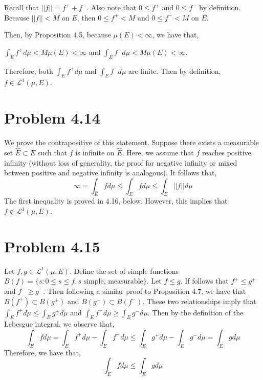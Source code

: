 \documentclass[letterpaper,12pt]{article}
\theoremstyle{definition}
\begin{document}
    Recall that $||f|| = f^+ +  f^-$.  Also note that $0 \leq f^+$ and $0 \leq f^-$ by definition. Because $||f|| < M$ on $E$, then $0 \leq f^+ < M$ and $0 \leq f^- < M$ on $E$.
\newline

 Then, by Proposition 4.5, because $\mu(E) < \infty$, we have that,


      $\int_E f^+ d\mu < M \mu(E) < \infty$ and $
      \int_E f^- d\mu < M \mu(E) < \infty$.
\newline

 Therefore, both $\int_E f^+ d\mu$ and $\int_E f^- d\mu$ are finite. Then by definition, $f \in \mathscr{L}^1(\mu, E)$.

 \section*{Problem 4.14}
  We prove the contrapositive of this statement. Suppose there exists a measurable set $\hat{E} \subset E$ such that $f$ is infinite on $\hat{E}$. Here, we assume that $f$ reaches positive infinity (without loss of generality, the proof for negative infinity or mixed between positive and negative infinity is analogous). It follows that,
  \begin{equation*}
  	\infty = \int_{\hat{E}} f d\mu \leq \int_E f d\mu \leq \int_E ||f|| d\mu
  \end{equation*}
  The first inequality is proved in 4.16, below. However, this implies that $f \not\in \mathscr{L}^1(\mu,E)$.

  \section*{Problem 4.15}
  Let $f,g \in \mathscr{L}^1(\mu,E)$. Define the set of simple functions $B(f) = \{ s : 0 \leq s \leq f, s \text{ simple, measurable}  \}$. Let $f \leq g$. If follows that $f^+ \leq g^+$ and $f^- \geq g^-$. Then following a similar proof to Proposition 4.7, we have that $B(f^+) \subset B(g^+)$ and $B(g^-) \subset B(f^-)$.
  These two relationships imply that $ \int_E f^+ d\mu \leq \int_E g^+ d\mu$ and $\int_E f^- d\mu \geq \int_E g^- d\mu$. Then by the definition of the Lebesgue integral, we observe that,
  \begin{equation*}
  	\int_E fd\mu = \int_E f^+ d\mu - \int_E f^- d\mu \leq \int_E g^+ d\mu - \int_E g^- d\mu = \int_E g d\mu
  \end{equation*}
  Therefore, we have that,
  \begin{equation*}
  	\int_E fd\mu \leq \int_E g d\mu
  \end{equation*}
\end{document}
